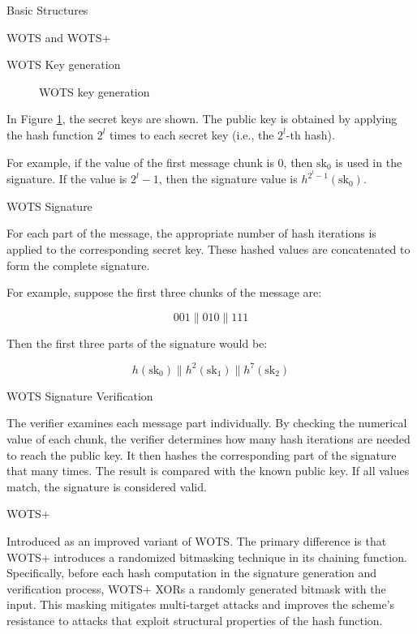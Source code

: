 \begin{section}{Basic Structures}{\label{sec1}}
\begin{subsection}{WOTS and WOTS+}
\begin{subsubsection}{WOTS Key generation}
\begin{figure}
\begin{tikzpicture}
        \end{tikzpicture}
            \caption{WOTS key generation}
            \label{fig:WOTS}
        \end{figure}

        In Figure \ref{fig:WOTS}, the secret keys are shown. The public key is obtained by applying the hash function \( 2^l \) times to each secret key (i.e., the \( 2^l \)-th hash). 

        For example, if the value of the first message chunk is 0, then \(\text{sk}_0\) is used in the signature. If the value is \( 2^l - 1 \), then the signature value is \( h^{2^l - 1}(\text{sk}_0) \).

        
    \end{subsubsection}

    \begin{subsubsection}{WOTS Signature}

        For each part of the message, the appropriate number of hash iterations is applied to the corresponding secret key. These hashed values are concatenated to form the complete signature.

        For example, suppose the first three chunks of the message are:
        
        \[
        001 \| 010 \| 111
        \]
        
        Then the first three parts of the signature would be:
        
        \[
        h(\text{sk}_0) \| h^2(\text{sk}_1) \| h^7(\text{sk}_2)
        \]
                
    \end{subsubsection}

    \begin{subsubsection}{WOTS Signature Verification}

        The verifier examines each message part individually. By checking the numerical value of each chunk, the verifier determines how many hash iterations are needed to reach the public key. It then hashes the corresponding part of the signature that many times. The result is compared with the known public key. If all values match, the signature is considered valid.
        
    \end{subsubsection}

    \begin{subsubsection}{WOTS+ \cite{cryptoeprint:2017/965}}

        Introduced as an improved variant of WOTS. The primary difference is that WOTS+ introduces a randomized bitmasking technique in its chaining function. Specifically, before each hash computation in the signature generation and verification process, WOTS+ XORs a randomly generated bitmask with the input. This masking mitigates multi-target attacks and improves the scheme’s resistance to attacks that exploit structural properties of the hash function. 
        

\end{subsubsection}
\end{subsection}
\end{section}
